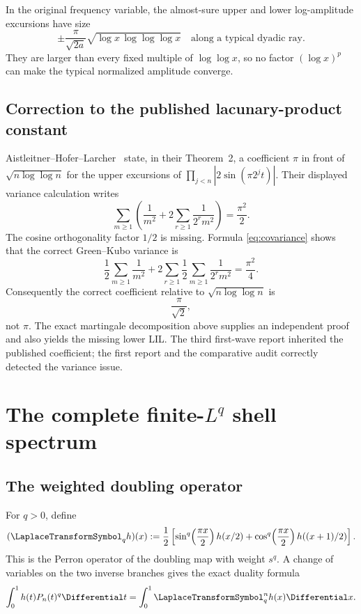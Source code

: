 \documentclass[11pt,oneside]{article}
\theoremstyle{definition}
\theoremstyle{remark}
\begin{document}
In the original frequency variable, the almost-sure upper and lower
log-amplitude excursions have size
\begin{equation}
 \pm\frac{\pi}{\sqrt{2a}}
 \sqrt{\log x\,\log\log\log x}
 \quad\text{along a typical dyadic ray}.
 \label{eq:LIL-x}
\end{equation}
They are larger than every fixed multiple of $\log\log x$, so no factor
$(\log x)^p$ can make the typical normalized amplitude converge.

\subsection{Correction to the published lacunary-product constant}
\label{subsec:AHL-correction}

Aistleitner--Hofer--Larcher~\cite{ahl2017} state, in their Theorem~2, a
coefficient $\pi$ in front of $\sqrt{n\log\log n}$ for the upper excursions of
$\prod_{j<n}|2\sin(\pi2^jt)|$.  Their displayed variance calculation writes
\[
 \sum_{m\ge1}\left(\frac1{m^2}
 +2\sum_{r\ge1}\frac1{2^rm^2}\right)=\frac{\pi^2}{2}.
\]
The cosine orthogonality factor $1/2$ is missing.  Formula
\eqref{eq:covariance} shows that the correct Green--Kubo variance is
\begin{equation}
 \frac12\sum_{m\ge1}\frac1{m^2}
 +2\sum_{r\ge1}\frac12\sum_{m\ge1}\frac1{2^rm^2}
 =\frac{\pi^2}{4}.
 \label{eq:AHL-corrected-variance}
\end{equation}
Consequently the correct coefficient relative to
$\sqrt{n\log\log n}$ is
\begin{equation}
 \boxed{\frac{\pi}{\sqrt2}},
 \label{eq:AHL-corrected-constant}
\end{equation}
not $\pi$.  The exact martingale decomposition above supplies an independent
proof and also yields the missing lower LIL.  The third first-wave report
inherited the published coefficient; the first report and the comparative
audit correctly detected the variance issue.

\section{The complete finite-\texorpdfstring{$L^q$}{Lq} shell spectrum}
\label{sec:Lq}

\subsection{The weighted doubling operator}

For $q>0$, define
\begin{equation}
 (\LaplaceTransformSymbol_qh)(x):=\frac12\left[
 \sin^q\!\left(\frac{\pi x}{2}\right)h(x/2)
 +\cos^q\!\left(\frac{\pi x}{2}\right)h((x+1)/2)
 \right].
 \label{eq:Lq-operator}
\end{equation}
This is the Perron operator of the doubling map with weight $s^q$.  A change
of variables on the two inverse branches gives the exact duality formula
\begin{equation}
 \int_0^1 h(t)P_n(t)^q\Differential t
 =\int_0^1\LaplaceTransformSymbol_q^nh(x)\Differential x.
 \label{eq:Lq-duality}
\end{equation}
\end{document}
